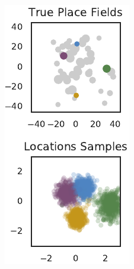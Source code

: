 \begin{figure}[t!]
\begin{center}
\begin{subfigure}[T]{1.4in}
      \label{fig:hipp_locations_7}
    \end{subfigure}
    \begin{subfigure}[T]{1.4in}
      \caption{}
      \vspace{-1em}
      \includegraphics[width=\textwidth]{figures/ch3/locations_11} 
      \label{fig:hipp_locations_11}
    \end{subfigure}


\end{center}
\end{figure}
